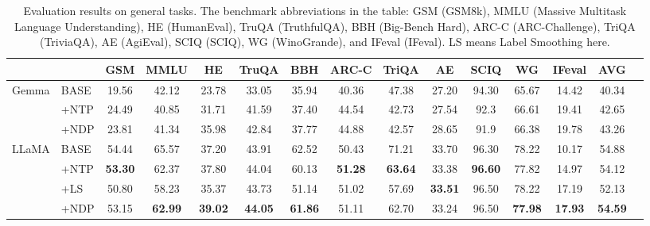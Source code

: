 \documentclass{article}
\begin{document}
\begin{table}[htbp]
\small
 \centering
\begin{tabular}{ll | c c c c c c c c c c c | c c}
\toprule
& & GSM & MMLU & HE &  TruQA & BBH & ARC-C & TriQA  &AE & SCIQ & WG & IFeval & AVG \\
\midrule
\multirow{3}{*}{Gemma} 
& BASE & 19.56 & 42.12 & 23.78 & 33.05 & 35.94 & 40.36 & 47.38 & 27.20 & 94.30 & 65.67 & 14.42 & 40.34 \\
& +NTP & 24.49 & 40.85 & 31.71 & 41.59 & 37.40 & 44.54 & 42.73 & 27.54 & 92.3 & 66.61 & 19.41 & 42.65 \\
& +NDP & 23.81 & 41.34 & 35.98 & 42.84 & 37.77 & 44.88 & 42.57 & 28.65 & 91.9 & 66.38 & 19.78 & 43.26 \\
\midrule
\midrule
\multirow{4}{*}{LLaMA}
& BASE & 54.44 & 65.57 & 37.20 & 43.91 & 62.52 & 50.43 & 71.21 & 33.70 & 96.30 & 78.22 & 10.17 & 54.88 \\
& +NTP & \textbf{53.30} & 62.37 & 37.80 & 44.04 & 60.13 & \textbf{51.28} & \textbf{63.64} & 33.38 & \textbf{96.60} & 77.82 & 14.97 & 54.12 \\
& +LS & 50.80 & 58.23 & 35.37 & 43.73 & 51.14 & 51.02 & 57.69 & \textbf{33.51} & 96.50 & 78.22 & 17.19 & 52.13 \\
& +NDP & 53.15 & \textbf{62.99} & \textbf{39.02} & \textbf{44.05} & \textbf{61.86} & 51.11 & 62.70 & 33.24 & 96.50 & \textbf{77.98} & \textbf{17.93} & \textbf{54.59} \\

\bottomrule
\end{tabular}
\caption{Evaluation results on general tasks. The benchmark abbreviations in the table: GSM (GSM8k), MMLU (Massive Multitask Language Understanding), HE (HumanEval), TruQA (TruthfulQA), BBH (Big-Bench Hard), ARC-C (ARC-Challenge), TriQA (TriviaQA), AE (AgiEval), SCIQ (SCIQ), WG (WinoGrande), and IFeval (IFeval). LS means Label Smoothing here.}
\label{tab:performance}
\end{table}
\end{document}
